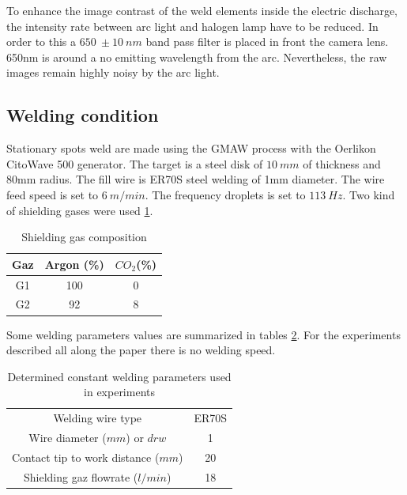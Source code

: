 \documentclass[12pt]{iopart}
\begin{document}
To enhance the image contrast of the weld elements inside the electric discharge,
the intensity rate between arc light and halogen lamp have to be reduced. In order to this
a $650\ \pm 10\ nm$ band pass filter is placed in front the camera lens. 650nm
is around a no emitting wavelength from the arc. Nevertheless, the raw images remain highly 
noisy by the arc light. 


\subsection{ Welding condition}
\label{ welding_conditions}

Stationary spots weld are made using the GMAW process with the Oerlikon CitoWave 500 generator. 
The target is a steel disk of $10\ mm$ of thickness and 80mm radius.
The fill wire is ER70S steel welding of 1mm diameter.
The  wire feed speed is set to $6\ m/min$. The frequency droplets is set to $113\ Hz$. 
Two kind of  shielding gases were used \ref{tab::gases}. 
\begin{table}[h]
\centering
\begin{tabular}{|c|c|c|}
\hline
Gaz & Argon (\%) & $CO_2$(\%) \\ \hline
G1 & 100       & 0 \\ \hline
G2 & 92        & 8 \\ \hline
\end{tabular}
\caption{Shielding gas composition}\label{tab::gases}
\end{table}

Some welding parameters values are summarized in tables \ref{table-parameters-static}.
For the experiments described all along the paper there is no welding speed.

\begin{table}
\begin{center}
\begin{tabular}{|cc|}
\hline
Welding wire type & ER70S \\ 
Wire diameter ($mm$) or $drw$ & 1 \\  
Contact tip to work distance ($mm$) & 20 \\
Shielding gaz flowrate ($l/min$) & 18 \\ \hline
\end{tabular}
\caption{{\small Determined constant welding parameters used in experiments}}
\label{table-parameters-static}
\end{center}
\end{table}
\end{document}
